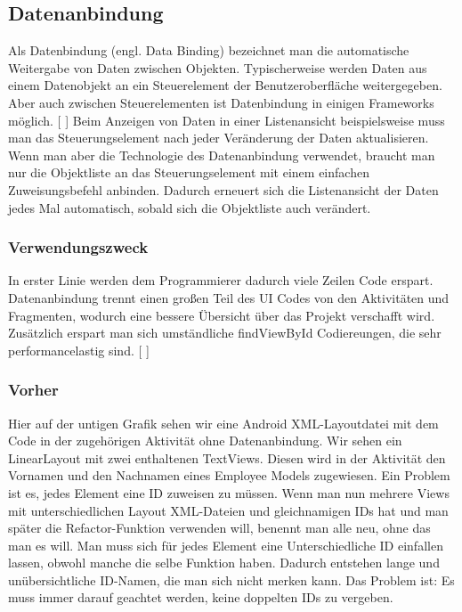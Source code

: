 \documentclass[FIPLY_base.tex]{subfiles}
\begin{document}
\subsection{Datenanbindung}
Als Datenbindung (engl. Data Binding) bezeichnet man die automatische Weitergabe von Daten zwischen Objekten. Typischerweise werden Daten aus einem Datenobjekt an ein Steuerelement der Benutzeroberfläche weitergegeben. Aber auch zwischen Steuerelementen ist Datenbindung in einigen Frameworks möglich. [ \cite{datbdef}]
\newline
Beim Anzeigen von Daten in einer Listenansicht beispielsweise muss man das Steuerungselement nach jeder Veränderung der Daten aktualisieren. Wenn man aber die Technologie des Datenanbindung verwendet, braucht man nur die Objektliste an das Steuerungselement mit einem einfachen Zuweisungsbefehl anbinden. Dadurch erneuert sich die Listenansicht der Daten jedes Mal automatisch, sobald sich die Objektliste auch verändert.


\subsubsection{Verwendungszweck}
In erster Linie werden dem Programmierer dadurch viele Zeilen Code erspart. Datenanbindung trennt einen großen Teil des UI Codes von den Aktivitäten und Fragmenten, wodurch eine bessere Übersicht über das Projekt verschafft wird. Zusätzlich erspart man sich umständliche findViewById Codiereungen, die sehr performancelastig sind. [ \cite{datbusing}]


\subsubsection{Vorher}

Hier auf der untigen Grafik sehen wir eine Android XML-Layoutdatei mit dem Code in der zugehörigen Aktivität ohne Datenanbindung. Wir sehen ein LinearLayout mit zwei enthaltenen TextViews. Diesen wird in der Aktivität den Vornamen und den Nachnamen eines Employee Models zugewiesen. Ein Problem ist es, jedes Element eine ID zuweisen zu müssen. Wenn man nun mehrere Views mit unterschiedlichen Layout XML-Dateien und gleichnamigen IDs hat und man später die Refactor-Funktion verwenden will, benennt man alle neu, ohne das man es will. Man muss sich für jedes Element eine Unterschiedliche ID einfallen lassen, obwohl manche die selbe Funktion haben. Dadurch entstehen lange und unübersichtliche ID-Namen, die man sich nicht merken kann. Das Problem ist: Es muss immer darauf geachtet werden, keine doppelten IDs zu vergeben.\\
\end{document}
